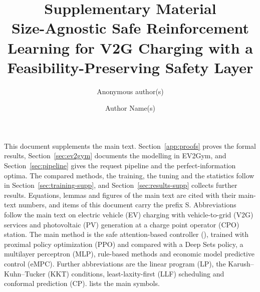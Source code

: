 \IfFileExists{saucis.cls}{\saucistrue\documentclass[final,9pt,onecolumn]{saucis}}{\saucisfalse\documentclass[10pt]{article}}
\title{Supplementary Material\\[1mm]\large Size-Agnostic Safe Reinforcement Learning for V2G Charging with a Feasibility-Preserving Safety Layer}
\author{Anonymous author(s)}
\author{Author Name(s)\\ \small \TODO{Affiliation(s)}}
\date{}
\begin{document}
\maketitle

This document supplements the main text.
Section~\ref{app:proofs} proves the formal results, Section~\ref{sec:ev2gym} documents the modelling in EV2Gym, and Section~\ref{sec:pipeline} gives the request pipeline and the perfect-information optima.
The compared methods, the training, the tuning and the statistics follow in Section~\ref{sec:training-supp}, and Section~\ref{sec:results-supp} collects further results.
Equations, lemmas and figures of the main text are cited with their main-text numbers, and items of this document carry the prefix S.
Abbreviations follow the main text on electric vehicle (EV) charging with vehicle-to-grid (V2G) services and photovoltaic (PV) generation at a charge point operator (CPO) station.
The main method is the safe attention-based controller (\method{}), trained with proximal policy optimization (PPO) and compared with a Deep Sets policy, a multilayer perceptron (MLP), rule-based methods and economic model predictive control (eMPC).
Further abbreviations are the linear program (LP), the Karush--Kuhn--Tucker (KKT) conditions, least-laxity-first (LLF) scheduling and conformal prediction (CP).
 lists the main symbols.








\clearpage
{}

\end{document}
